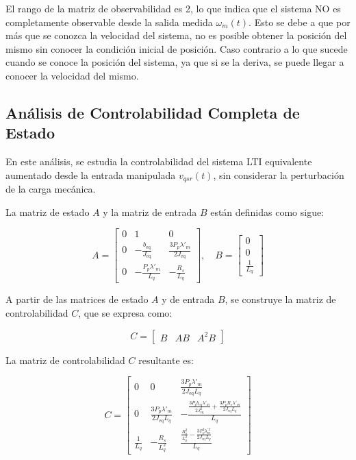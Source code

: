 \documentclass{article}
\begin{document}
El rango de la matriz de observabilidad es 2, lo que indica que el sistema NO es completamente observable desde la salida medida \(\omega_m(t)\). Esto se debe a que por más que se conozca la velocidad del sistema, no es posible obtener la posición del mismo sin conocer la condición inicial de posición. Caso contrario a lo que sucede cuando se conoce la posición del sistema, ya que si se la deriva, se puede llegar a conocer la velocidad del mismo.



\subsection{Análisis de Controlabilidad Completa de Estado}

En este análisis, se estudia la controlabilidad del sistema LTI equivalente aumentado desde la entrada manipulada \( v_{qsr}(t) \), sin considerar la perturbación de la carga mecánica.

La matriz de estado \( A \) y la matriz de entrada \( B \) están definidas como sigue:

\[
A = \begin{bmatrix}
0 & 1 & 0 \\
0 & -\frac{b_{\text{eq}}}{J_{\text{eq}}} & \frac{3 P_{p} \lambda'_{m}}{2 J_{\text{eq}}} \\
0 & -\frac{P_{p} \lambda'_{m}}{L_q} & -\frac{R_s}{L_q}
\end{bmatrix}, \quad
B = \begin{bmatrix}
0 \\
0 \\
\frac{1}{L_q}
\end{bmatrix}
\]

A partir de las matrices de estado \( A \) y de entrada \( B \), se construye la matriz de controlabilidad \( C \), que se expresa como:

\[
C = \begin{bmatrix}
B & A B & A^2 B
\end{bmatrix}
\]

La matriz de controlabilidad \( C \) resultante es:

\[
C = \begin{bmatrix}
0 & 0 & \frac{3 P_p \lambda'_{m}}{2 J_{\text{eq}} L_q} \\
0 & \frac{3 P_p \lambda'_{m}}{2 J_{\text{eq}} L_q} & -\frac{\frac{3 P_p b_{\text{eq}} \lambda'_{m}}{2 J_{\text{eq}}^2} + \frac{3 P_p R_s \lambda'_{m}}{2 J_{\text{eq}} L_q}}{L_q} \\
\frac{1}{L_q} & -\frac{R_s}{L_q^2} & \frac{\frac{R_s^2}{L_q^2} - \frac{3 P_p^2 \lambda^{'2}_{m}}{2 J_{\text{eq}} L_q}}{L_q}
\end{bmatrix}
\]
\end{document}
